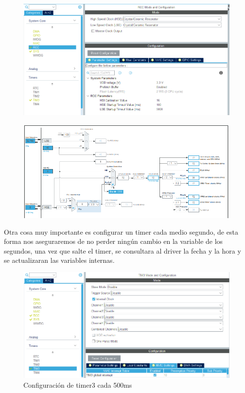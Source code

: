 \documentclass[10pt,a4paper,oneside]{article}
\begin{document}
\begin{figure}[H]
\centering
\includegraphics[scale=0.5]{Imagenes/Clock_CFG2.png}
\caption[Configuración de la frecuencia del sistema]{ }
\label{fig:002}
\end{figure}

\begin{figure}[H]
\centering
\includegraphics[scale=0.5]{Imagenes/Clock_CFG1.png}
\caption[Configuración de la frecuencia del sistema]{ }
\label{fig:003}
\end{figure}

Otra cosa muy importante es configurar un timer cada medio segundo, de esta forma nos aseguraremos de no perder ningún cambio en la variable de los segundos, una vez que salte el timer, se consultara al driver la fecha y la hora y se actualizaran las variables internas.

\begin{figure}[H]
\centering
\includegraphics[scale=0.5]{Imagenes/TIMER3_CFG1.png}
\caption[Configuración de timer3 cada 500ms]{Configuración de timer3 cada 500ms}
\label{fig:004}
\end{figure}
\end{document}
